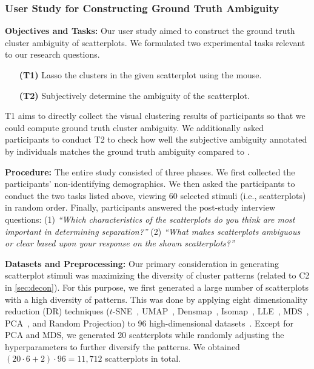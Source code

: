 \subsubsection{User Study for Constructing Ground Truth Ambiguity}

\label{sec:mainstudydesc}

\noindent
\textbf{Objectives and Tasks:}
Our user study aimed to construct the ground truth cluster ambiguity of scatterplots. We formulated two experimental tasks relevant to our research questions.

\begin{itemize}[noitemsep] %
    \item[\textbf{(T1)}] Lasso the clusters in the given scatterplot using the mouse.
    \item[\textbf{(T2)}] Subjectively determine the ambiguity of the scatterplot.
\end{itemize}
T1 aims to directly collect the visual clustering results of participants so that we could 
compute ground truth cluster ambiguity. We additionally asked participants to conduct T2 to check how well the subjective ambiguity annotated by individuals matches the ground truth ambiguity compared to \measure.

\noindent
\textbf{Procedure:}
The entire study consisted of three phases. 
We first collected the participants' non-identifying demographics.
We then asked the participants to conduct the two tasks listed above, viewing 60 selected stimuli (i.e., scatterplots) in random order.
Finally, participants answered the post-study interview questions: (1) \textit{``Which characteristics of the scatterplots do you think are most important in determining separation?''} (2) \textit{``What makes scatterplots ambiguous or clear based upon your response on the shown scatterplots?''}



\noindent
\textbf{Datasets and Preprocessing:} Our primary consideration in generating scatterplot stimuli was maximizing the diversity of cluster patterns (related to C2 in \autoref{sec:decon}). For this purpose, we first generated a large number of scatterplots with a high diversity of patterns. This was done by applying eight dimensionality reduction (DR) techniques ($t$-SNE~\cite{maaten08jmlr}, UMAP~\cite{mcinnes2020arxiv}, Densmap~\cite{narayan2021assessing}, Isomap~\cite{tenenbaum00aaas}, LLE~\cite{roweis00science}, MDS~\cite{kruskal64psycho}, PCA~\cite{pearson01pmjs}, and Random Projection) to 96 high-dimensional datasets~\cite{jeon22arxiv}. Except for PCA and MDS, we generated 20 scatterplots while randomly adjusting the hyperparameters to further diversify the patterns. We obtained $(20 \cdot 6 + 2) \cdot 96  = 11,712$ scatterplots in total.

